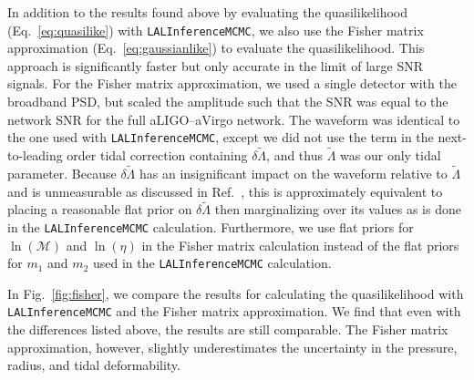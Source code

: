 \documentclass[twocolumn,prd,amssymb,aps,nofootinbib,showpacs,epsf]{revtex4}
\begin{document}
In addition to the results found above by evaluating the quasilikelihood (Eq.~\eqref{eq:quasilike}) with \texttt{LALInferenceMCMC}, we also use the Fisher matrix approximation (Eq.~\eqref{eq:gaussianlike}) to evaluate the quasilikelihood. This approach is significantly faster but only accurate in the limit of large SNR signals. For the Fisher matrix approximation, we used a single detector with the broadband PSD, but scaled the amplitude such that the SNR was equal to the network SNR for the full aLIGO--aVirgo network. The waveform was identical to the one used with \texttt{LALInferenceMCMC}, except we did not use the term in the next-to-leading order tidal correction containing $\delta\tilde\Lambda$, and thus $\tilde\Lambda$ was our only tidal parameter. Because $\delta\tilde\Lambda$ has an insignificant impact on the waveform relative to $\tilde\Lambda$ and is unmeasurable as discussed in Ref.~\cite{WadeCreightonOchsner2014}, this is approximately equivalent to placing a reasonable flat prior on $\delta\tilde\Lambda$ then marginalizing over its values as is done in the \texttt{LALInferenceMCMC} calculation. Furthermore, we use flat priors for $\ln(\mathcal{M})$ and $\ln(\eta)$ in the Fisher matrix calculation instead of the flat priors for $m_1$ and $m_2$ used in the \texttt{LALInferenceMCMC} calculation.

In Fig.~\ref{fig:fisher}, we compare the results for calculating the quasilikelihood with \texttt{LALInferenceMCMC} and the Fisher matrix approximation.  We find that even with the differences listed above, the results are still comparable. The Fisher matrix approximation, however, slightly underestimates the uncertainty in the pressure, radius, and tidal deformability.
\end{document}
